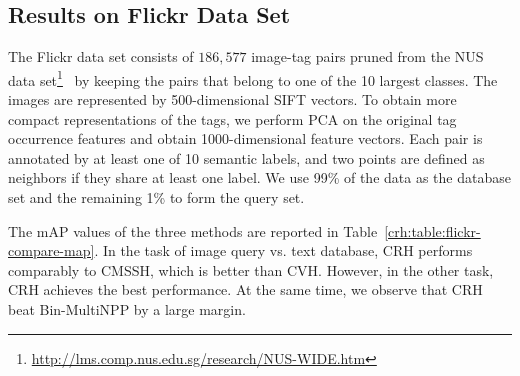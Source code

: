 
\subsection{Results on \mbox{Flickr} Data Set}

The \mbox{Flickr} data set consists of $186{,}577$ image-tag pairs  pruned from the \mbox{NUS} data set\footnote{\url{http://lms.comp.nus.edu.sg/research/NUS-WIDE.htm}}~\cite{nus-wide-civr09} by keeping the pairs that belong to one of the 10 largest classes. The images are represented by 500-dimensional \mbox{SIFT} vectors. To obtain more compact representations of the tags, we perform \mbox{PCA} on the original tag occurrence features and obtain 1000-dimensional feature vectors. Each pair is annotated by at least one of 10 semantic labels, and two points are defined as neighbors if they share at least one label. We use 99\% of the data as the database set and the remaining 1\% to form the query set.


The mAP values of the three methods are reported in Table~\ref{crh:table:flickr-compare-map}. In the task of image query vs. text database, \mbox{CRH} performs comparably to \mbox{CMSSH}, which is better than \mbox{CVH}. However, in the other task, \mbox{CRH} achieves the best performance. At the same time, we observe that CRH beat Bin-MultiNPP by a large margin.


